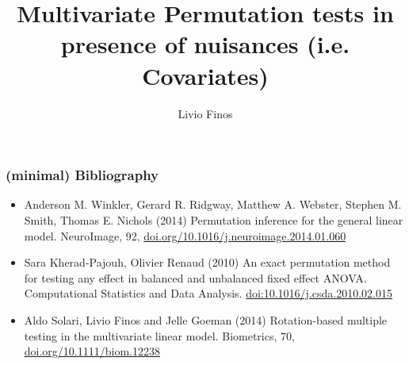 \documentclass[xcolor={pdftex,dvipsnames,table}]{beamer}
\title{Multivariate Permutation tests in presence of nuisances (i.e. Covariates)}
\author{Livio Finos}
\institute{University of Padova}
\date{}
\begin{document}
{
\begin{frame}
\titlepage
\end{frame}
}

\begin{frame}
\frametitle{(minimal) Bibliography}

\begin{itemize}
\item Anderson M. Winkler, Gerard R. Ridgway, Matthew A. Webster, Stephen M. Smith, Thomas E. Nichols (2014)
Permutation inference for the general linear model.
NeuroImage, 92, \url{doi.org/10.1016/j.neuroimage.2014.01.060}
\item Sara Kherad-Pajouh, Olivier Renaud (2010) An exact permutation method for testing any effect in balanced and unbalanced fixed effect ANOVA. Computational Statistics and Data Analysis. \url{doi:10.1016/j.csda.2010.02.015}
\item Aldo Solari, Livio Finos and Jelle Goeman (2014) Rotation-based multiple testing in the multivariate linear model.
Biometrics, 70, \url{doi.org/10.1111/biom.12238}
\end{itemize}

\end{frame}

\end{document}
